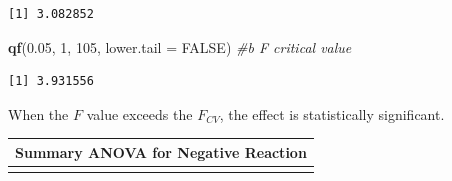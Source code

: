 \documentclass[
  11pt,
]{book}
\newenvironment{Shaded}{\begin{snugshade}}{\end{snugshade}}
\newcommand{\AttributeTok}[1]{\textcolor[rgb]{0.27,0.27,0.27}{#1}}
\newcommand{\CommentTok}[1]{\textcolor[rgb]{0.37,0.37,0.37}{\textit{#1}}}
\newcommand{\ConstantTok}[1]{\textcolor[rgb]{0.37,0.37,0.37}{#1}}
\newcommand{\DecValTok}[1]{\textcolor[rgb]{0.06,0.06,0.06}{#1}}
\newcommand{\FloatTok}[1]{\textcolor[rgb]{0.06,0.06,0.06}{#1}}
\newcommand{\FunctionTok}[1]{\textcolor[rgb]{0.27,0.27,0.27}{\textbf{#1}}}
\newcommand{\NormalTok}[1]{#1}
\begin{document}
\begin{verbatim}
[1] 3.082852
\end{verbatim}

\begin{Shaded}
\begin{Highlighting}[]
\FunctionTok{qf}\NormalTok{(}\FloatTok{0.05}\NormalTok{, }\DecValTok{1}\NormalTok{, }\DecValTok{105}\NormalTok{, }\AttributeTok{lower.tail =} \ConstantTok{FALSE}\NormalTok{)  }\CommentTok{\#b F critical value}
\end{Highlighting}
\end{Shaded}

\begin{verbatim}
[1] 3.931556
\end{verbatim}

When the \(F\) value exceeds the \(F_{CV}\), the effect is statistically significant.

\begin{longtable}[]{@{}l@{}}
\toprule\noalign{}
Summary ANOVA for Negative Reaction \\
\midrule\noalign{}
\endhead
\bottomrule\noalign{}
\endlastfoot
\end{longtable}
\end{document}
